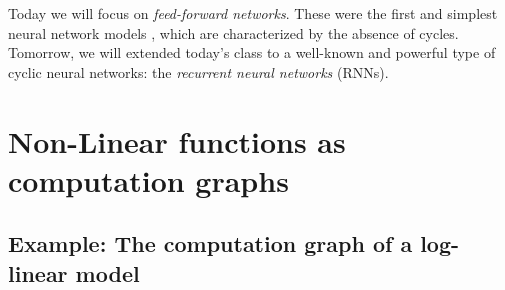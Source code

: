 Today we will focus on \textit{feed-forward networks}. These were the first and simplest neural network models , which are characterized by the absence of cycles. Tomorrow, we will extended 
today's class to a well-known and powerful type of cyclic neural networks: the \textit{recurrent neural networks} (RNNs). 

\section{Non-Linear functions as computation graphs} 

\subsection{Example: The computation graph of a log-linear model}


